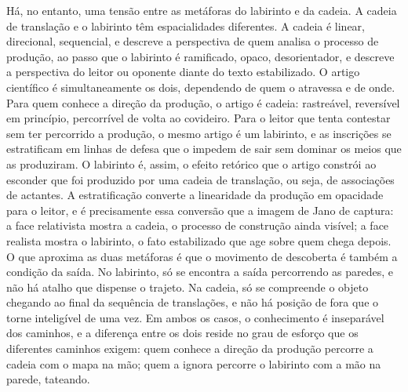 Há, no entanto, uma tensão entre as metáforas do labirinto e da cadeia. A cadeia de translação e o labirinto têm espacialidades diferentes. A cadeia é linear, direcional, sequencial, e descreve a perspectiva de quem analisa o processo de produção, ao passo que o labirinto é ramificado, opaco, desorientador, e descreve a perspectiva do leitor ou oponente diante do texto estabilizado. O artigo científico é simultaneamente os dois, dependendo de quem o atravessa e de onde. Para quem conhece a direção da produção, o artigo é cadeia: rastreável, reversível em princípio, percorrível de volta ao covideiro. Para o leitor que tenta contestar sem ter percorrido a produção, o mesmo artigo é um labirinto, e as inscrições se estratificam em linhas de defesa que o impedem de sair sem dominar os meios que as produziram. O labirinto é, assim, o efeito retórico que o artigo constrói ao esconder que foi produzido por uma cadeia de translação, ou seja, de associações de actantes. A estratificação converte a linearidade da produção em opacidade para o leitor, e é precisamente essa conversão que a imagem de Jano de \textcite{Latour2011CienciaEmAcao} captura: a face relativista mostra a cadeia, o processo de construção ainda visível; a face realista mostra o labirinto, o fato estabilizado que age sobre quem chega depois. O que aproxima as duas metáforas é que o movimento de descoberta é também a condição da saída. No labirinto, só se encontra a saída percorrendo as paredes, e não há atalho que dispense o trajeto. Na cadeia, só se compreende o objeto chegando ao final da sequência de translações, e não há posição de fora que o torne inteligível de uma vez. Em ambos os casos, o conhecimento é inseparável dos caminhos, e a diferença entre os dois reside no grau de esforço que os diferentes caminhos exigem: quem conhece a direção da produção percorre a cadeia com o mapa na mão; quem a ignora percorre o labirinto com a mão na parede, tateando.

